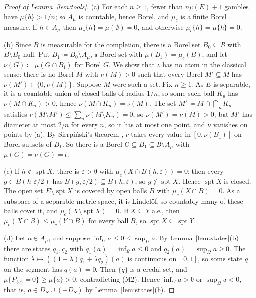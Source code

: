 \documentclass[11pt]{article}
\DeclareMathOperator{\spt}{spt}
\theoremstyle{plain}
\theoremstyle{definition}
\theoremstyle{remark}
\begin{document}
\begin{proof}[Proof of Lemma~\ref{lem:tools}]
(a) For each $n\ge1$, fewer than $n\mu(E)+1$ gambles have $\mu\{h\}>1/n$; so $A_\mu$ is
countable, hence Borel, and $\mu_c$ is a finite Borel measure. If $h\in A_\mu$ then
$\mu_c\{h\}=\mu(\emptyset)=0$, and otherwise $\mu_c\{h\}=\mu\{h\}=0$.

(b) Since $B$ is measurable for the completion, there is a Borel set $B_0\subseteq B$ with
$B\setminus B_0$ null. Put $B_1\coloneqq B_0\setminus A_\mu$, a Borel set with $\mu(B_1)=
\mu_c(B)$, and let $\nu(G)\coloneqq\mu(G\cap B_1)$ for Borel $G$. We show that $\nu$ has no
atom in the classical sense: there is no Borel $M$ with $\nu(M)>0$ such that every Borel
$M'\subseteq M$ has $\nu(M')\in\{0,\nu(M)\}$. Suppose $M$ were such a set. Fix $n\ge1$. As $E$
is separable, it is a countable union of closed balls of radius $1/n$, so some such ball $K_n$
has $\nu(M\cap K_n)>0$, hence $\nu(M\cap K_n)=\nu(M)$. The set $M'\coloneqq M\cap\bigcap_nK_n$
satisfies $\nu(M\setminus M')\le\sum_n\nu(M\setminus K_n)=0$, so $\nu(M')=\nu(M)>0$; but $M'$
has diameter at most $2/n$ for every $n$, so it has at most one point, and $\nu$ vanishes on
points by (a). By Sierpi\'nski's theorem \cite{Sierpinski}, $\nu$ takes every value in
$[0,\nu(B_1)]$ on Borel subsets of $B_1$. So there is a Borel $G\subseteq B_1\subseteq
B\setminus A_\mu$ with $\mu(G)=\nu(G)=t$.

(c) If $h\notin\spt X$, there is $\varepsilon>0$ with $\mu_c(X\cap B(h,\varepsilon))=0$; then
every $g\in B(h,\varepsilon/2)$ has $B(g,\varepsilon/2)\subseteq B(h,\varepsilon)$, so
$g\notin\spt X$. Hence $\spt X$ is closed. The open set $E\setminus\spt X$ is covered by open
balls $B$ with $\mu_c(X\cap B)=0$. As a subspace of a separable metric space, it is Lindel\"of,
so countably many of these balls cover it, and $\mu_c(X\setminus\spt X)=0$. If $X\subseteq Y$
a.e., then $\mu_c(X\cap B)\le\mu_c(Y\cap B)$ for every ball $B$, so $\spt X\subseteq\spt Y$.

(d) Let $a\in A_\mu$, and suppose $\inf_\Omega a\le0\le\sup_\Omega a$. By
Lemma~\ref{lem:states}(b) there are states $q_1,q_2$ with $q_1(a)=\inf_\Omega a\le0$ and
$q_2(a)=\sup_\Omega a\ge0$. The function $\lambda\mapsto((1-\lambda)q_1+\lambda q_2)(a)$ is
continuous on $[0,1]$, so some state $q$ on the segment has $q(a)=0$. Then $\{q\}$ is a credal
set, and $\mu\{P_{\{q\}}=0\}\ge\mu\{a\}>0$, contradicting (M2). Hence $\inf_\Omega a>0$ or
$\sup_\Omega a<0$, that is, $a\in D_S\cup(-D_S)$ by Lemma~\ref{lem:states}(b).
\end{proof}
\end{document}
